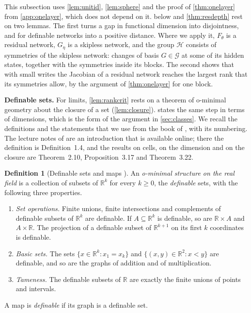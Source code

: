 \documentclass[10pt]{article}
\theoremstyle{definition}
\newtheorem{definition}[theorem]{Definition}
\theoremstyle{remark}
\newcommand{\R}{\mathbb{R}}
\newcommand{\G}{\mathcal{G}}
\newcommand{\para}[1]{\smallskip\noindent\textbf{#1}\hspace{0.5em}}
\begin{document}
This subsection uses \cref{lem:unitid}, \cref{lem:sphere} and the proof of \cref{thm:onelayer} from \cref{app:onelayer}, which does not depend on it.  below and \cref{thm:resdepth} rest on two lemmas. The first turns a gap in functional dimension into disjointness, and for definable networks into a positive distance. Where we apply it, $F_\theta$ is a residual network, $G_\eta$ is a skipless network, and the group $\mathcal H$ consists of symmetries of the skipless network: changes of basis $G \in \G$ at some of its hidden states, together with the symmetries inside its blocks. The second shows that with small writes the Jacobian of a residual network reaches the largest rank that its symmetries allow, by the argument of \cref{thm:onelayer} for one block.

\para{Definable sets.} For limits, \cref{lem:rankcrit} rests on a theorem of o-minimal geometry about the closure of a set (\cref{lem:closure}).  states the same step in terms of dimensions, which is the form of the argument in \cref{sec:classes}. We recall the definitions and the statements that we use from the book of \citet{vandendries1998tame}, with its numbering. The lecture notes of \citet{coste1999ominimal} are an introduction that is available online; there the definition is Definition~1.4, and the results on cells, on the dimension and on the closure are Theorem~2.10, Proposition~3.17 and Theorem~3.22.

\begin{definition}[Definable sets and maps {\citep[Chapter~1, (2.1) and (3.2)]{vandendries1998tame}}]\label{def:definable}
An \emph{o-minimal structure on the real field} is a collection of subsets of $\R^k$ for every $k \ge 0$, the \emph{definable} sets, with the following three properties.
\begin{enumerate}[label=\textup{(\roman*)},nosep]
\item \emph{Set operations.} Finite unions, finite intersections and complements of definable subsets of $\R^k$ are definable. If $A \subseteq \R^k$ is definable, so are $\R \times A$ and $A \times \R$. The projection of a definable subset of $\R^{k+1}$ on its first $k$ coordinates is definable.
\item \emph{Basic sets.} The sets $\{x \in \R^k : x_1 = x_k\}$ and $\{(x, y) \in \R^2 : x < y\}$ are definable, and so are the graphs of addition and of multiplication.
\item \emph{Tameness.} The definable subsets of $\R$ are exactly the finite unions of points and intervals.
\end{enumerate}
A map is \emph{definable} if its graph is a definable set.
\end{definition}
\end{document}
